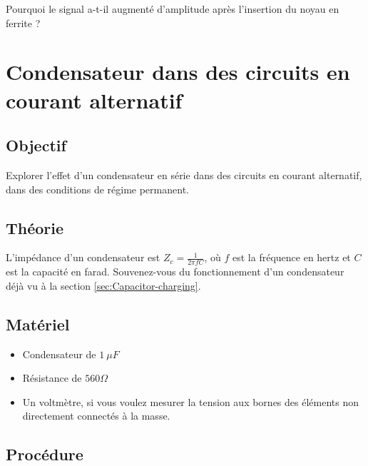 \documentclass{book}
\begin{document}
Pourquoi le signal a-t-il augmenté d'amplitude après l'insertion du noyau en ferrite ?










\section{Condensateur dans des circuits en courant alternatif}


 \label{sec:Capacitor-in-AC}

\subsection{Objectif}


Explorer l'effet d'un condensateur en série dans des circuits en courant alternatif, dans des conditions de régime permanent.

\subsection{Théorie}


L'impédance d'un condensateur est $Z_{c}=\frac{1}{2\pi fC}$, où $f$  est la fréquence en hertz et $C$ est la capacité en farad. Souvenez-vous du fonctionnement d'un condensateur déjà vu à la section  \ref{sec:Capacitor-charging}.

\subsection{Matériel}


\begin{itemize}
  \item Condensateur de $1\ \mu F$
  \item Résistance de $560 \Omega$
  \item Un voltmètre, si vous voulez mesurer la tension aux bornes des éléments non directement connectés à la masse.
\end{itemize}

\subsection{Procédure}
\end{document}
